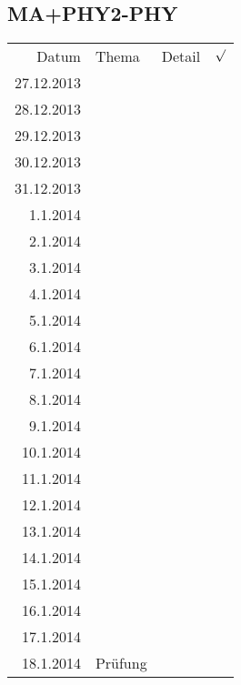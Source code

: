 \subsection{MA+PHY2-PHY}
\begin{tabular}{r l p{} l}
\rowcolor{lgray} Datum       & Thema         & Detail & $\surd$ \\
\rowcolor{white}  27.12.2013 &               &  &  \\
\rowcolor{lgray}  28.12.2013 &               &  &  \\
\rowcolor{white}  29.12.2013 &               &  &  \\
\rowcolor{lgray}  30.12.2013 &               &  &  \\
\rowcolor{white}  31.12.2013 &               &  &  \\
\rowcolor{lgray}    1.1.2014 &               &  &  \\
\rowcolor{white}    2.1.2014 &               &  &  \\
\rowcolor{lgray}    3.1.2014 &               &  &  \\
\rowcolor{white}    4.1.2014 &               &  &  \\
\rowcolor{lgray}    5.1.2014 &               &  &  \\
\rowcolor{white}    6.1.2014 &               &  &  \\
\rowcolor{lgray}    7.1.2014 &               &  &  \\
\rowcolor{white}    8.1.2014 &               &  &  \\
\rowcolor{lgray}    9.1.2014 &               &  &  \\
\rowcolor{white}   10.1.2014 &               &  &  \\
\rowcolor{lgray}   11.1.2014 &               &  &  \\
\rowcolor{white}   12.1.2014 &               &  &  \\
\rowcolor{lgray}   13.1.2014 &               &  &  \\
\rowcolor{white}   14.1.2014 &               &  &  \\
\rowcolor{lgray}   15.1.2014 &               &  &  \\
\rowcolor{white}   16.1.2014 &               &  &  \\
\rowcolor{lgray}   17.1.2014 &               &  &  \\
\rowcolor{white}   18.1.2014 & Prüfung       &  &  \\
\end{tabular}

